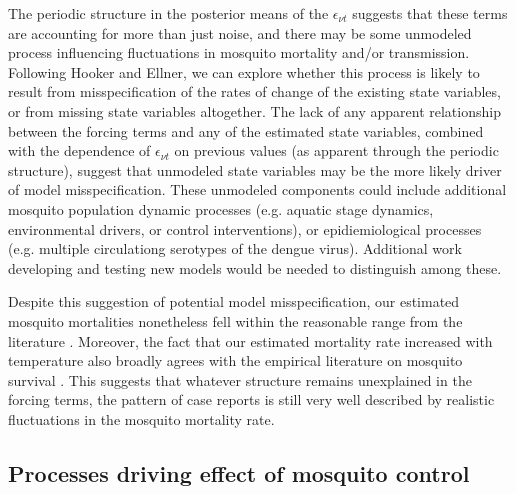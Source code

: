 \documentclass[10pt,letterpaper]{article}
\begin{document}
The periodic structure in the posterior means of the $\epsilon_{\nu t}$ suggests that these terms are accounting for more than just noise, and there may be some unmodeled process influencing fluctuations in mosquito mortality and/or transmission.
Following Hooker and Ellner, we can explore whether this process is likely to result from misspecification of the rates of change of the existing state variables, or from missing state variables altogether. 
The lack of any apparent relationship between the forcing terms and any of the estimated state variables, combined with the dependence of $\epsilon_{\nu t}$ on previous values (as apparent through the periodic structure), suggest that unmodeled state variables may be the more likely driver of model misspecification.
These unmodeled components could include additional mosquito population dynamic processes (e.g. aquatic stage dynamics, environmental drivers, or control interventions), or epidiemiological processes (e.g. multiple circulationg serotypes of the dengue virus).
Additional work developing and testing new models would be needed to distinguish among these.

Despite this suggestion of potential model misspecification, our estimated mosquito mortalities nonetheless fell within the reasonable range from the literature \cite{Maciel-de-Freitas2008, Brady2013}.
Moreover, the fact that our estimated mortality rate increased with temperature also broadly agrees with the empirical literature on mosquito survival \cite{Yang2009, Brady2013}.
This suggests that whatever structure remains unexplained in the forcing terms, the pattern of case reports is still very well described by realistic fluctuations in the mosquito mortality rate.

\subsection*{Processes driving effect of mosquito control}
\end{document}

